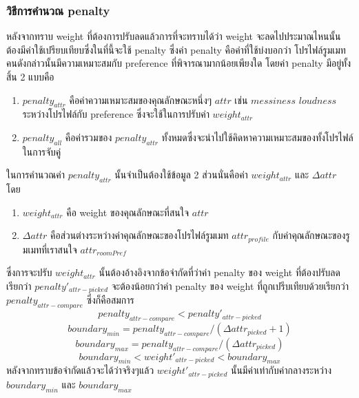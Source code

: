 \subsubsection{วิธีการคำนวณ penalty}
หลังจากทราบ weight ที่ต้องการปรับลดแล้วการที่จะทราบได้ว่า weight จะลดไปประมาณไหนนั้นต้องมีค่าใช้เปรียบเทียบซึ่งในที่นี้จะใช้ penalty
ซึ่งค่า penalty คือค่าที่ใช้บ่งบอกว่า โปรไฟล์รูมเมทคนดังกล่าวนั้นมีความเหมาะสมกับ preference ที่พิจารณามากน้อยเพียงใด
โดยค่า penalty มีอยู่ทั้งสิ้น 2 แบบคือ
\begin{enumerate}
  \item $penalty_{attr}$ คือค่าความเหมาะสมของคุณลักษณะหนึ่งๆ $attr$ เช่น $messiness$ $loudness$ ระหว่างโปรไฟล์กับ preference ซึ่งจะใช้ในการปรับค่า $weight_{attr}$
  \item $penalty_{all}$ คือค่ารวมของ $penalty_{attr}$ ทั้งหมดซึ่งจะนำไปใช้คิดหาความเหมาะสมของทั้งโปรไฟล์ในการจับคู่
\end{enumerate}

ในการคำนวณค่า $penalty_{attr}$ นั้นจำเป็นต้องใช้ข้อมูล 2 ส่วนนั่นคือค่า $weight_{attr}$ และ $\Delta attr$ โดย
\begin{enumerate}
  \item $weight_{attr}$ คือ weight ของคุณลักษณะที่สนใจ $attr$
  \item $\Delta attr$ คือส่วนต่างระหว่างค่าคุณลักษณะของโปรไฟล์รูมเมท $attr_{profile}$ 
  กับค่าคุณลักษณะของรูมเมทที่เราสนใจ $attr_{roomPref}$ 
\end{enumerate}
ซึ่งการจะปรับ $weight_{attr}$ นั้นต้องอ้างอิงจากข้อจำกัดที่ว่าค่า penalty ของ weight ที่ต้องปรับลดเรียกว่า
$penalty'_{attr-picked}$ จะต้องน้อยกว่าค่า penalty ของ weight ที่ถูกเปรีบเทียบด้วยเรียกว่า
$penalty_{attr-compare}$ ซึ่งก็คือสมการ
\begin{equation}
  penalty_{attr-compare} < penalty'_{attr-picked}
\end{equation}
\begin{equation}
  boundary_{min} = penalty_{attr-compare}/(\Delta attr_{picked} + 1) 
\end{equation}
\begin{equation}
  boundary_{max} = penalty_{attr-compare}/(\Delta attr_{picked})
\end{equation}
\begin{equation}
  boundary_{min}
  < weight'_{attr-picked} 
  < boundary_{max} 
\end{equation}
หลังจากทราบข้อจำกัดแล้วจะได้ว่าจริงๆแล้ว $weight'_{attr-picked}$ นั้นมีค่าเท่ากับค่ากลางระหว่าง $boundary_{min}$ 
และ $boundary_{max}$

